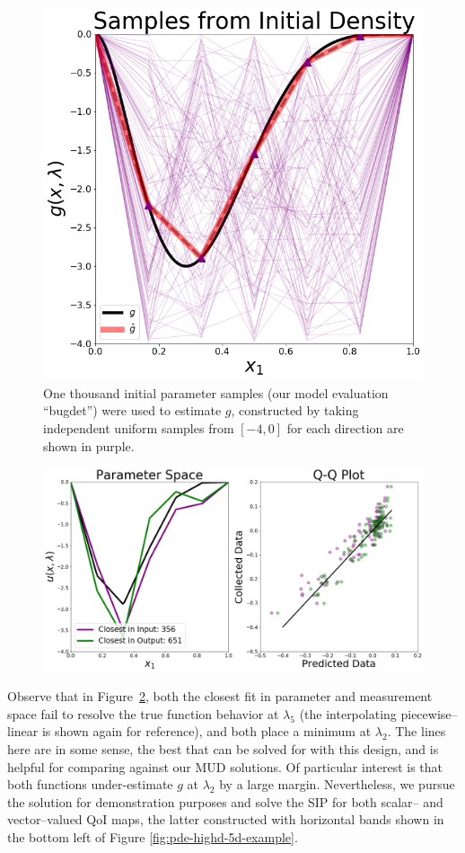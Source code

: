 \begin{figure}
\centering
  \includegraphics[width=0.475\linewidth]{figures/pde-highd/pde-highd_init_D5.png}
\caption{
One thousand initial parameter samples (our model evaluation ``bugdet'') were used to estimate $g$, constructed by taking independent uniform samples from $[-4, 0]$ for each direction are shown in purple.
}
\label{fig:pde-highd-initial-5d}
\end{figure}


\begin{figure}[htbp]
\centering
  \includegraphics[width=0.675\linewidth]{figures/pde-highd/pde-highd_proj_D5}
\caption{
}
\label{fig:pde-5d-proj}
\end{figure}

Observe that in Figure~\ref{fig:pde-5d-proj}, both the closest fit in parameter and measurement space fail to resolve the true function behavior at $\lambda_5$ (the interpolating piecewise--linear is shown again for reference), and both place a minimum at $\lambda_2$.
The lines here are in some sense, the best that can be solved for with this design, and is helpful for comparing against our MUD solutions.
Of particular interest is that both functions under-estimate $g$ at $\lambda_2$ by a large margin.
Nevertheless, we pursue the solution for demonstration purposes and solve the SIP for both scalar-- and vector--valued QoI maps, the latter constructed with horizontal bands shown in the bottom left of Figure \ref{fig:pde-highd-5d-example}.

